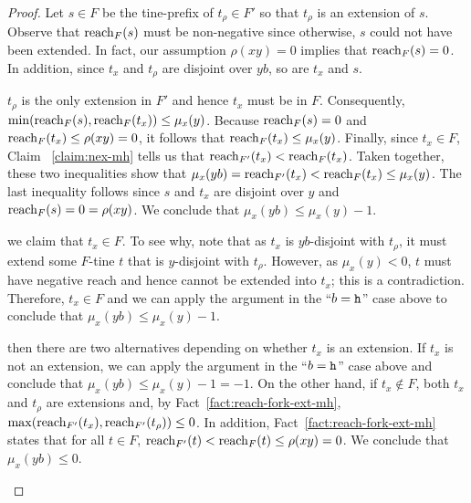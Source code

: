 \begin{proof}
    Let $s \in F$ be the tine-prefix of $t_\rho \in F'$ so that 
    $t_\rho$ is an extension of $s$. 
    Observe that $\operatorname{reach}_F(s)$ must be non-negative since 
    otherwise, $s$ could not have been extended. 
    In fact, our assumption $\rho(xy)=0$ implies that 
    $\operatorname{reach}_F(s) = 0$. 
    In addition, since $t_x$ and $t_\rho$ are disjoint over $yb$, 
    so are $t_x$ and $s$. 
    \begin{description}[font=\normalfont\itshape\space]
      \item[If $b = \h$,] 
      $t_\rho$ is the only extension in $F'$ and hence 
      $t_x$ must be in $F$. 
      Consequently, 
      $\min( \operatorname{reach}_F(s),\operatorname{reach}_F(t_x) ) \leq \mu_x(y)$. 
      Because $\operatorname{reach}_F(s)=0$ and $\operatorname{reach}_F(t_x) \leq \rho(xy)=0$, it follows that $\operatorname{reach}_F(t_x) \leq \mu_x(y)$. 
      Finally, since $t_x \in F$, 
      Claim ~\ref{claim:nex-mh} tells us that 
      $\operatorname{reach}_{F'}(t_x) < \operatorname{reach}_F(t_x)$. 
      Taken together, these two inequalities show that 
      $\mu_x(yb) = \operatorname{reach}_{F'}(t_x) < \operatorname{reach}_F(t_x) \leq \mu_x(y)$. 
      The last inequality follows since $s$ and $t_x$ are disjoint over $y$ and $\operatorname{reach}_F(s) = 0 = \rho(xy)$. 
      We conclude that $\mu_x(yb) \leq \mu_x(y) - 1$.

      \item[If $b = \H$ and $\mu_x(y) < 0$,] 
      we claim that $t_x \in F$. 
      To see why, note that as $t_x$ is $yb$-disjoint with $t_\rho$, 
      it must extend some $F$-tine $t$ that is $y$-disjoint with $t_\rho$. 
      However, as $\mu_x(y) < 0$, $t$ must have negative reach and hence cannot be extended into $t_x$; this is a contradiction. 
      Therefore, $t_x \in F$ and we can apply the argument in the ``$b = \h$'' case above 
      to conclude that $\mu_x(yb) \leq \mu_x(y) - 1$.

      \item[If $b = \H$ and $\mu_x(y) = 0$,] 
      then there are two alternatives depending on 
      whether $t_x$ is an extension. 
      If $t_x$ is not an extension, we can apply the argument in the ``$b = \h$'' case above and conclude that 
      $\mu_x(yb) \leq \mu_x(y) - 1 = -1$.
      On the other hand, if $t_x \not\in F$, 
      both $t_x$ and $t_\rho$ are extensions and, 
      by Fact~\ref{fact:reach-fork-ext-mh}, 
      $\max(\operatorname{reach}_{F'}(t_x), \operatorname{reach}_{F'}(t_\rho) ) \leq 0$. 
      In addition, Fact~\ref{fact:reach-fork-ext-mh} states that for all $t \in F$, 
      $\operatorname{reach}_{F'}(t) < \operatorname{reach}_{F}(t) \leq \rho(xy) = 0$. 
      We conclude that $\mu_x(yb) \leq 0$.


\end{description}
\end{proof}
